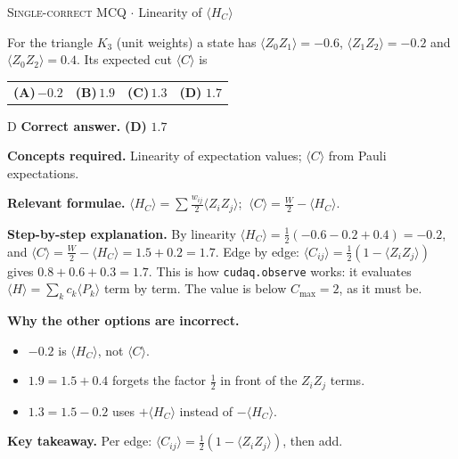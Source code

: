 \documentclass[11pt,a4paper]{article}
\newcommand{\optlabel}[1]{\textbf{(#1)}}
\newcommand{\correctlabel}[1]{\textcolor{okgreen}{\textbf{(#1)}\,\ding{51}}}
\newenvironment{qitem}[1]{\begin{list}{}{\setlength{\leftmargin}{3.3em}\setlength{\labelwidth}{3.1em}%
  \setlength{\labelsep}{0.2em}\setlength{\topsep}{3pt}\setlength{\parsep}{3pt}}\item[\textbf{Q.#1}\hfill]}{\end{list}}
\newcommand{\qsep}{\par\vspace{2pt}{\color{black!15}\hrule}\vspace{4pt}}
\newcommand{\qmeta}[2]{{\footnotesize\color{black!60}\textsc{#1} \;$\cdot$\; #2}\par}
\begin{document}
\begin{qitem}{36}
\qmeta{Single-correct MCQ}{Linearity of $\langle H_C\rangle$}
For the triangle $K_3$ (unit weights) a state has $\langle Z_0Z_1\rangle = -0.6$, $\langle Z_1Z_2\rangle = -0.2$ and
$\langle Z_0Z_2\rangle = 0.4$. Its expected cut $\langle C\rangle$ is
\par\smallskip\noindent\begin{tabularx}{\linewidth}{@{}*{4}{L}@{}}
\optlabel{A}\,$-0.2$ & \optlabel{B}\,$1.9$ & \optlabel{C}\,$1.3$ & \correctlabel{D}\,$1.7$
\end{tabularx}
\end{qitem}
\begin{solbox}{D}
\textbf{\color{brand}Correct answer.} \textcolor{okgreen}{\textbf{(D)}} $1.7$

\textbf{\color{brand}Concepts required.} Linearity of expectation values; $\langle C\rangle$ from Pauli expectations.

\textbf{\color{brand}Relevant formulae.} $\langle H_C\rangle = \sum\tfrac{w_{ij}}{2}\langle Z_iZ_j\rangle$; $\ \langle C\rangle = \tfrac W2 - \langle H_C\rangle$.

\textbf{\color{brand}Step-by-step explanation.} By linearity $\langle H_C\rangle = \tfrac12(-0.6 - 0.2 + 0.4) = -0.2$, and $\langle C\rangle = \tfrac W2 - \langle H_C\rangle = 1.5 + 0.2 = 1.7$.
Edge by edge: $\langle C_{ij}\rangle = \tfrac12(1 - \langle Z_iZ_j\rangle)$ gives $0.8 + 0.6 + 0.3 = 1.7$.
This is how \texttt{cudaq.observe} works: it evaluates $\langle H\rangle = \sum_k c_k\langle P_k\rangle$ term by term. The value is below
$C_{\max} = 2$, as it must be.

\textbf{\color{brand}Why the other options are incorrect.}
\begin{itemize}[leftmargin=2.4em, itemsep=1pt, topsep=2pt]
\item[\textbf{(A)}] $-0.2$ is $\langle H_C\rangle$, not $\langle C\rangle$.
\item[\textbf{(B)}] $1.9 = 1.5 + 0.4$ forgets the factor $\frac12$ in front of the $Z_iZ_j$ terms.
\item[\textbf{(C)}] $1.3 = 1.5 - 0.2$ uses $+\langle H_C\rangle$ instead of $-\langle H_C\rangle$.
\end{itemize}
\textbf{\color{brand}Key takeaway.} Per edge: $\langle C_{ij}\rangle = \frac12(1 - \langle Z_iZ_j\rangle)$, then add.
\end{solbox}
\qsep
\end{document}
